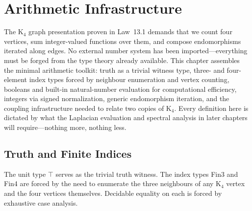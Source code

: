 \documentclass[11pt,a4paper]{book}
\def\texttt#1{#1}%
\begin{document}
\chapter{Arithmetic Infrastructure}

The K$_4$ graph presentation proven in Law~13.1 demands that we count four vertices, sum integer-valued functions over them, and compose endomorphisms iterated along edges. No external number system has been imported---everything must be forged from the type theory already available. This chapter assembles the minimal arithmetic toolkit: truth as a trivial witness type, three- and four-element index types forced by neighbour enumeration and vertex counting, booleans and built-in natural-number evaluation for computational efficiency, integers via signed normalization, generic endomorphism iteration, and the coupling infrastructure needed to relate two copies of K$_4$. Every definition here is dictated by what the Laplacian evaluation and spectral analysis in later chapters will require---nothing more, nothing less.

\section{Truth and Finite Indices}

The unit type $\top$ serves as the trivial truth witness. The index types \texttt{Fin3}
and \texttt{Fin4} are forced by the need to enumerate the three neighbours of any K$_4$
vertex and the four vertices themselves. Decidable equality on each is forced by
exhaustive case analysis.
\end{document}
